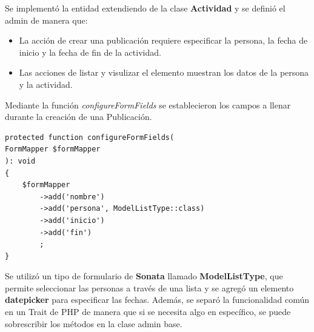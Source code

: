 
Se implementó la entidad extendiendo de la clase \textbf{Actividad} y se definió el admin de manera que:

\begin{itemize}
    \item La acción de crear una publicación requiere especificar la persona, la fecha de inicio y la fecha de fin de la actividad.
    \item Las acciones de listar y visulizar el elemento muestran los datos de la persona y la actividad.
\end{itemize}

Mediante la función \textit{configureFormFields} se establecieron los campos a llenar durante la creación de una Publicación.

\begin{lstlisting}[caption={Definición de campos durante la creación de Publiciaciones.\\Fuente: Elaboración propia}]
protected function configureFormFields(
FormMapper $formMapper
): void
{
    $formMapper
        ->add('nombre')
        ->add('persona', ModelListType::class)
        ->add('inicio')
        ->add('fin')
        ;
}
\end{lstlisting}

Se utilizó un tipo de formulario de \textbf{Sonata} llamado \textbf{ModelListType}, que permite seleccionar las personas a través de una lista y se agregó un elemento \textbf{datepicker} para especificar
las fechas\@. Además, se separó la funcionalidad común en un Trait de PHP de manera que si se necesita algo en específico, se puede sobrescribir los métodos en la clase admin base.
